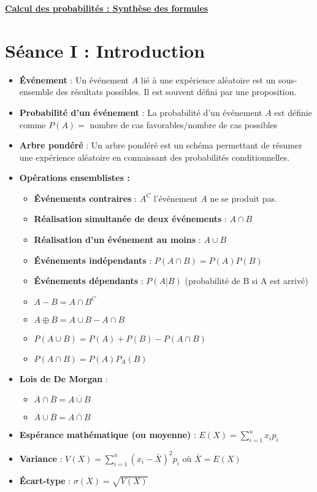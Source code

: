 \documentclass[a4paper,11pt]{report}
\begin{document}
\renewcommand{\labelitemi}{$\cdot$}
\renewcommand{\labelitemii}{$\diamond$}
\renewcommand{\labelitemiii}{$\cdot$}
\begin{Large}\begin{center}
   \underline{\textbf{Calcul des probabilités : Synthèse des formules}}
\end{center}\end{Large}

\section{Séance I : Introduction}
\begin{itemize}
	\item \textbf{Événement} : Un événement $A$ lié à une expérience aléatoire est un sous-ensemble des résultats possibles. Il est souvent défini par une proposition.
	\item \textbf{Probabilité d'un événement} : La probabilité d'un événement $A$ est définie comme $P(A)=$ nombre de cas favorables$/$nombre de cas possibles
	\item \textbf{Arbre pondéré} : Un arbre pondéré est un schéma permettant de résumer une expérience aléatoire en connaissant des probabilités conditionnelles.
	\item \textbf{Opérations ensemblistes :}
		\begin{itemize}
			\item \textbf{Événements contraires} : $A^C$ l'événement $A$ ne se produit pas.
			\item \textbf{Réalisation simultanée de deux événements} : $A \cap B$
			\item \textbf{Réalisation d'un événement au moins} : $A \cup B$
			\item \textbf{Événements indépendants} : $P(A \cap B) = P(A) P(B)$
			\item \textbf{Événements dépendants} : $P(A|B)$ (probabilité de B si A est arrivé)
			\item $A - B = A \cap B^C$
			\item $A \oplus B = A \cup B - A \cap B$
			\item $P(A \cup B) = P(A)+P(B)-P(A \cap B)$
			\item $P(A \cap B) = P(A)P_A(B)$
		\end{itemize}
	\item \textbf{Lois de De Morgan} :
		\begin{itemize}
			\item $\overline{A} \cap \overline{B} = \overline{A \cup B}$
			\item $\overline{A} \cup \overline{B} = \overline{A \cap B}$
		\end{itemize}
	\item \textbf{Espérance mathématique (ou moyenne)} : $E(X)=\sum\limits_{i=1}^{n}{x_ip_i}$
	\item \textbf{Variance} : $V(X)=\sum\limits_{i=1}^{n}{(x_i-\bar{X})^2p_i}$ où $\bar{X} = E(X)$
	\item \textbf{Écart-type} : $\sigma(X) = \sqrt{V(X)}$
\end{itemize}
\end{document}
